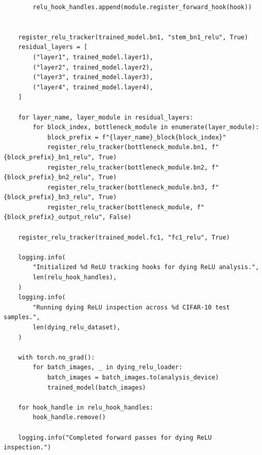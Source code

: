 \documentclass[11pt, oneside]{article}   	%
\begin{document}
\begin{answerbox}
\begin{verbatim}
        relu_hook_handles.append(module.register_forward_hook(hook))
    
    
    register_relu_tracker(trained_model.bn1, "stem_bn1_relu", True)
    residual_layers = [
        ("layer1", trained_model.layer1),
        ("layer2", trained_model.layer2),
        ("layer3", trained_model.layer3),
        ("layer4", trained_model.layer4),
    ]
    
    for layer_name, layer_module in residual_layers:
        for block_index, bottleneck_module in enumerate(layer_module):
            block_prefix = f"{layer_name}_block{block_index}"
            register_relu_tracker(bottleneck_module.bn1, f"{block_prefix}_bn1_relu", True)
            register_relu_tracker(bottleneck_module.bn2, f"{block_prefix}_bn2_relu", True)
            register_relu_tracker(bottleneck_module.bn3, f"{block_prefix}_bn3_relu", True)
            register_relu_tracker(bottleneck_module, f"{block_prefix}_output_relu", False)
    
    register_relu_tracker(trained_model.fc1, "fc1_relu", True)
    
    logging.info(
        "Initialized %d ReLU tracking hooks for dying ReLU analysis.",
        len(relu_hook_handles),
    )
    logging.info(
        "Running dying ReLU inspection across %d CIFAR-10 test samples.",
        len(dying_relu_dataset),
    )
    
    with torch.no_grad():
        for batch_images, _ in dying_relu_loader:
            batch_images = batch_images.to(analysis_device)
            trained_model(batch_images)
    
    for hook_handle in relu_hook_handles:
        hook_handle.remove()
    
    logging.info("Completed forward passes for dying ReLU inspection.")
    

\end{verbatim}
\end{answerbox}
\end{document}
